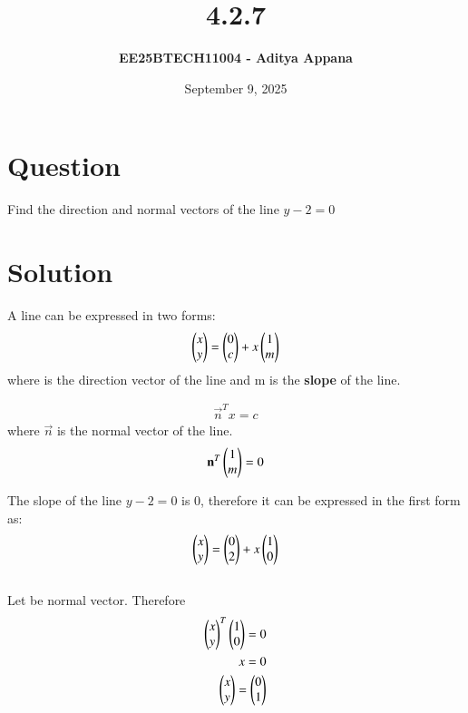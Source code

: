 \documentclass[12pt]{article}
\title{\textbf{4.2.7}}
\author{\textbf{EE25BTECH11004 - Aditya Appana}}
\date{September 9, 2025}
\begin{document}
\maketitle

\section*{Question}
Find the direction and normal vectors of the line $y-2=0$

\section*{Solution}
A line can be expressed in two forms:
\begin{align}
\begin{pmatrix}x\\y\end{pmatrix} = \begin{pmatrix}0\\c\end{pmatrix} + x\begin{pmatrix}1\\m\end{pmatrix}
\end{align}
where  is the direction vector of the line and m is the \textbf{slope} of the line.

\begin{align}
{\vec{n}}^{T}x = c
\end{align}
where $\vec{n}$ is the normal vector of the line. \begin{align}{\mathbf{n}}^T\begin{pmatrix}1\\m\end{pmatrix} = 0\end{align}

\vspace{1cm}

The slope of the line $y-2=0$ is 0, therefore it can be expressed in the first form as:
\begin{align}
\begin{pmatrix}x\\y\end{pmatrix} = \begin{pmatrix}0\\2\end{pmatrix} + x\begin{pmatrix}1\\0\end{pmatrix}
\end{align}\\

Let  be normal vector. Therefore
\begin{align}
\begin{pmatrix}x\\ y\end{pmatrix}^T\begin{pmatrix}1\\0\end{pmatrix} = 0 \\
x = 0\\
\begin{pmatrix}x\\y\end{pmatrix} = \begin{pmatrix}0\\1\end{pmatrix}
\end{align}
\end{document}
